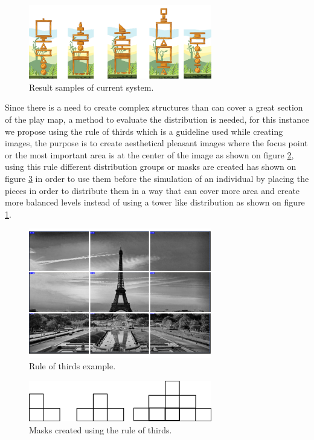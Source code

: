 \documentclass[conference]{IEEEtran}
\begin{document}
\begin{figure}[htbp]
\centerline{\includegraphics[width=80mm]{Images/result_example.png}}
\caption{Result samples of current system.}
\label{results_old}
\end{figure}

Since there is a need to create complex structures than can cover a great
section of the play map, a method to evaluate the distribution is needed, for
this instance we propose using the rule of thirds \cite{DarrenRowse} which is a
guideline used while creating images, the purpose is to create
aesthetical pleasant images where the focus point or the most important area is
at the center of the image as shown on figure \ref{rule_of_thirds}, using this
rule different distribution groups or masks are created has shown on figure
\ref{rule_of_thirds_masks} in order to use them before the simulation of an
individual by placing the pieces in order to distribute them in a way that can cover
more area and create more balanced levels instead of using a tower like
distribution as shown on figure \ref{results_old}.

\begin{figure}[htbp]
    \centerline{\includegraphics[width=80mm]{Images/ruleofthirds_example.png}}
    \caption{Rule of thirds example.}
    \label{rule_of_thirds}
\end{figure}

\begin{figure}[htbp]
    \centerline{\includegraphics[width=80mm]{Images/mask_distribution.png}}
    \caption{Masks created using the rule of thirds.}
    \label{rule_of_thirds_masks}
\end{figure}
\end{document}
